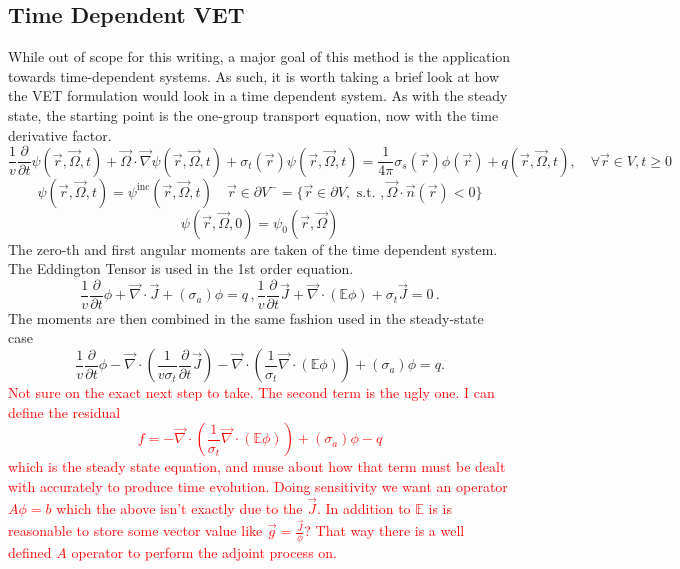 \documentclass[12pt]{report}
\newcommand{\vr}{\vec{r}}
\newcommand{\vO}{\vec{\Omega}}
\renewcommand{\div}{\vec{\nabla} \cdot}
\newcommand{\grad}{\vec{\nabla}}
\newcommand{\Edd}{\mathbb{E}}
\newcommand{\sigt}{\sigma_t}
\newcommand{\sigs}{\sigma_s}
\newcommand{\siga}{\sigma_a}
\newcommand{\scalSource}{q}
\newcommand{\comment}[2]{\marginpar{\textcolor{#2}{$\star$}}\textcolor{#2}{#1}\newline}
\newcommand{\iwh}[1]{\comment{#1}{red}}
\newcommand{\iwh}[1]{\phantom{a}}
\begin{document}
\begin{appendices}

\section{Time Dependent VET}
While out of scope for this writing, a major goal of this method is the application towards time-dependent systems. As such, it is worth taking a brief look at how the VET formulation would look in a time dependent system. As with the steady state, the starting point is the one-group transport equation, now with the time derivative factor.
\begin{equation}
\label{Trans1GTE}
\frac{1}{v} \frac{\partial}{\partial t} \psi(\vr,\vO,t)+ \vO \cdot \grad \psi(\vr,\vO,t) + \sigt(\vr) \psi(\vr,\vO,t) = \frac{1}{4 \pi} \sigs(\vr) \phi(\vr) + q(\vr,\vO,t), \quad \forall \vr \in V,t \geq 0
\end{equation}
\begin{equation}
\label{Trans1GTE_bc}
\psi(\vr,\vO,t) = \psi^{\text{inc}}(\vr,\vO,t) \quad \vr \in \partial V^{-} = \{ \vr \in \partial V, \text{ s.t. }, \vO \cdot \vec{n}(\vr) < 0\}
\end{equation}
\begin{equation}
\label{Trans1GTE_t0}
\psi(\vr,\vO,0) = \psi_0(\vr,\vO)
\end{equation}
The zero-th and first angular moments are taken of the time dependent system. The Eddington Tensor is used in the 1st order equation.
\begin{subequations}
%
\begin{equation}
\label{0amTrans}
\frac{1}{v} \frac{\partial}{\partial t}\phi + \div \vec{J} + (\siga) \phi = \scalSource \,,
\end{equation}
%
\begin{equation}
\label{1amTrans}
\frac{1}{v} \frac{\partial}{\partial t}\vec{J}  + \div \left( \Edd \phi \right) + \sigt \vec{J} = 0 \,.
\end{equation}
%
\end{subequations}
The moments are then combined in the same fashion used in the steady-state case
\begin{equation}
\label{VETTrans}
\frac{1}{v} \frac{\partial}{\partial t}\phi - \div \left( \frac{1}{v \sigt} \frac{\partial}{\partial t}\vec{J} \right)   - \div \left( \frac{1}{\sigt} \div \left( \Edd \phi \right) \right)  + (\siga) \phi = \scalSource.
\end{equation}
\iwh{Not sure on the exact next step to take. The second term is the ugly one. I can define the residual 
\begin{equation}
f=- \div \left( \frac{1}{\sigt} \div \left( \Edd \phi \right) \right)  + (\siga) \phi - \scalSource
\end{equation}
which is the steady state equation, and muse about how that term must be dealt with accurately to produce time evolution. 
Doing sensitivity we want an operator $A \phi = b$ which the above isn't exactly due to the $\vec{J}$. In addition to $\Edd$ is is reasonable to store some vector value like $\vec{g}=\frac{\vec{J}}{\phi}$? That way there is a well defined $A$ operator to perform the adjoint process on.}
\end{appendices}
\end{document}
